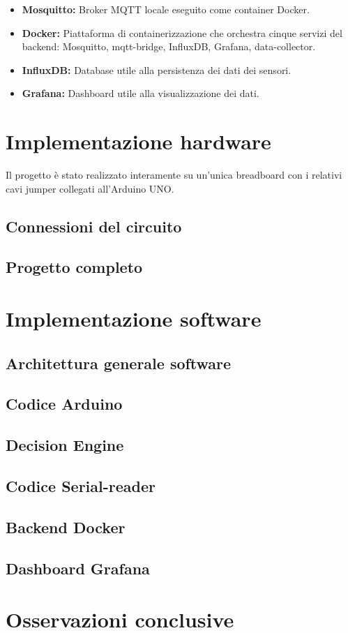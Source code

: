 \documentclass{article}
\begin{document}
\begin{itemize}
    \item \textbf{Mosquitto:}
    Broker MQTT locale eseguito come container Docker.

    \item \textbf{Docker:}
    Piattaforma di containerizzazione che orchestra cinque servizi del backend:
    Mosquitto, mqtt-bridge, InfluxDB, Grafana, data-collector.

    \item \textbf{InfluxDB:}
    Database utile alla persistenza dei dati dei sensori.

    \item \textbf{Grafana:}
    Dashboard utile alla visualizzazione dei dati.

    
\end{itemize}
\section{\Large Implementazione hardware}

Il progetto è stato realizzato interamente su un'unica breadboard con i relativi cavi jumper collegati all'Arduino UNO.

\subsection{Connessioni del circuito}

\subsection{Progetto completo}


\section{\Large Implementazione software}

\subsection{Architettura generale software}

\subsection{Codice Arduino}

\subsection{Decision Engine}

\subsection{Codice Serial-reader}

\subsection{Backend Docker}

\subsection{Dashboard Grafana}



\section{\Large Osservazioni conclusive}
\end{document}

